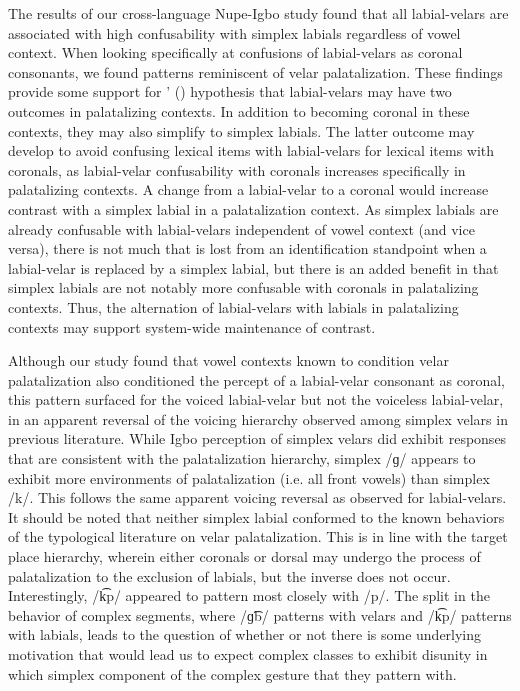\documentclass[output=paper,colorlinks,citecolor=brown
]{langscibook}
\begin{document}
The results of our cross-language Nupe-Igbo study found that all labial-velars are associated with high confusability with simplex labials regardless of vowel context. When looking specifically at confusions of labial-velars as coronal consonants, we found patterns reminiscent of velar palatalization. These findings provide some support for \citeauthor{Burns2023}' (\citeyear{Burns2023}) hypothesis that labial-velars may have two outcomes in palatalizing contexts. In addition to becoming coronal in these contexts, they may also simplify to simplex labials. The latter outcome may develop to avoid confusing lexical items with labial-velars for lexical items with coronals, as labial-velar confusability with coronals increases specifically in palatalizing contexts. A change from a labial-velar to a coronal would increase contrast with a simplex labial in a palatalization context. As simplex labials are already confusable with labial-velars independent of vowel context (and vice versa), there is not much that is lost from an identification standpoint when a labial-velar is replaced by a simplex labial, but there is an added benefit in that simplex labials are not notably more confusable with coronals in palatalizing contexts. Thus, the alternation of labial-velars with labials in palatalizing contexts may support system-wide maintenance of contrast. 

Although our study found that vowel contexts known to condition velar palatalization also conditioned the percept of a labial-velar consonant as coronal, this pattern surfaced for the voiced labial-velar but not the voiceless labial-velar, in an apparent reversal of the voicing hierarchy observed among simplex velars in previous literature. While Igbo perception of simplex velars did exhibit responses that are consistent with the palatalization hierarchy, simplex /ɡ/ appears to exhibit more environments of palatalization (i.e. all front vowels) than simplex /k/. This follows the same apparent voicing reversal as observed for labial-velars. It should be noted that neither simplex labial conformed to the known behaviors of the typological literature on velar palatalization. This is in line with the target place hierarchy, wherein either coronals or dorsal may undergo the process of palatalization to the exclusion of labials, but the inverse does not occur. Interestingly, /k͡p/ appeared to pattern most closely with /p/. The split in the behavior of complex segments, where /ɡ͡b/ patterns with velars and /k͡p/ patterns with labials, leads to the question of whether or not there is some underlying motivation that would lead us to expect complex classes to exhibit disunity in which simplex component of the complex gesture that they pattern with.
\end{document}
